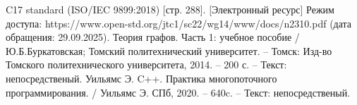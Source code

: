 \begin{thebibliography}{}
	 C17 standard (ISO/IEC 9899:2018) [стр. 288]. [Электронный ресурс] Режим доступа: https://www.open-std.org/jtc1/sc22/wg14/www/docs/n2310.pdf (дата обращения: 29.09.2025).
	 Теория графов. Часть 1: учебное пособие / Ю.Б.Буркатовская; Томский политехнический университет. – Томск: Изд-во Томского политехнического университета, 2014. – 200 с. -- Текст: непосредственый.
	 Уильямс Э. C++. Практика многопоточного программирования. / Уильямс Э. СПб, 2020. -- 640c. -- Текст: непосредственый.
\end{thebibliography}
